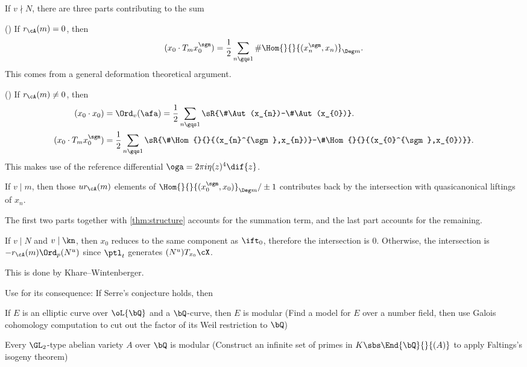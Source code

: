 \documentclass[a4paper, twoside]{article}
\begin{document}
\begin{prf}
	If $v\nmid N$, there are three parts contributing to the sum
	\begin{enr}
		\item (\cite[III.4.4]{GZ1986}) If $r_{\cA}(m)=0$, then
		\[
			(x_{0}\cdot T_{m}x_{0}^{\sgm})=\frac{1}{2}\sum_{n\gqs1}\#\Hom{}{}{(x_{n}^{\sgm},x_{n})}_{\Deg m}.
		\]
		This comes from a general deformation theoretical argument.
		\item (\cite[III.8.2]{GZ1986}) If $r_{\cA}(m)\neq0$, then
		\begin{align*}
		  (x_{0}\cdot x_{0})&=\Ord_{v}(\afa)=\frac{1}{2}\sum_{n\gqs1}\sR{\#\Aut(x_{n})-\#\Aut(x_{0})}.\\
		  (x_{0}\cdot T_{m}x_{0}^{\sgm})&=\frac{1}{2}\sum_{n\gqs1}\sR{\#\Hom{}{}{(x_{n}^{\sgm},x_{n})}-\#\Hom{}{}{(x_{0}^{\sgm},x_{0})}}.
		\end{align*}
		This makes use of the reference differential $\oga=2\pi i\eta(z)^{4}\dif{z}$.
		\item If $v\mid m$, then those $ur_{\cA}(m)$ elements of $\Hom{}{}{(x_{0}^{\sgm},x_{0})}_{\Deg m}/\pm1$ contributes back by the intersection with quasicanonical liftings of $x_{n}$.
	\end{enr}
	The first two parts together with \cref{thm:structure} accounts for the summation term, and the last part accounts for the remaining.

	If $v\mid N$ and $v\mid \kn$, then $x_{0}$ reduces to the same component as $\ift_{0}$, therefore the intersection is $0$. Otherwise, the intersection is $-r_{\cA}(m)\Ord_{p}(N^{u})$ since $\ptl_{t}$ generates $(N^{u})T_{x_{0}}\cX$.
\end{prf}

This is done by Khare--Wintenberger\cite{KW2009-1,KW2009-2}.


Use \cite{Ribet1992} for its consequence: If Serre's conjecture holds, then
\begin{itm}
	\item If $E$ is an elliptic curve over $\oL{\bQ}$ and a $\bQ$-curve, then $E$ is modular (Find a model for $E$ over a number field, then use Galois cohomology computation to cut out the factor of its Weil restriction to $\bQ$)
	\item Every $\GL_{2}$-type abelian variety $A$ over $\bQ$ is modular (Construct an infinite set of primes in $K\sbs\End{\bQ}{}{(A)}$ to apply Faltings's isogeny theorem)
\end{itm}
\end{document}
